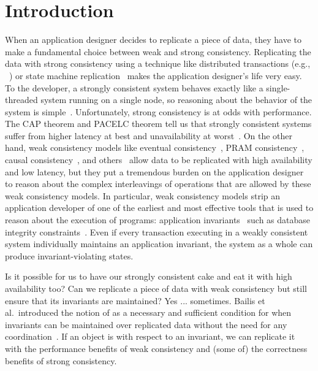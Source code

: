 \section{Introduction}
When an application designer decides to replicate a piece of data, they have to
make a fundamental choice between weak and strong consistency. Replicating the
data with strong consistency using a technique like distributed transactions (e.g., ~\cite{bernstein1981concurrency,mohan1986transaction}) or state machine
replication~\cite{schneider1990implementing, lamport1998part,
liskov2012viewstamped, ongaro2014search, moraru2013there, vincent2015designing,
oki1988viewstamped, lamport2005generalized, lamport2006fast}  makes the
application designer's life very easy. To the developer, a strongly
consistent system behaves exactly like a single-threaded system running on a
single node, so reasoning about the behavior of the system is
simple~\cite{herlihy1990linearizability}.  Unfortunately, strong consistency is
at odds with performance. The CAP theorem and PACELC theorem tell us that
strongly consistent systems suffer from higher latency at best and
unavailability at worst~\cite{gilbert2002brewer, brewer2012cap,
abadi2012consistency}. On the other hand, weak consistency models like eventual
consistency~\cite{vogels2009eventually}, PRAM
consistency~\cite{lipton1988pram}, causal consistency~\cite{ahamad1995causal},
and others~\cite{lloyd2011don, mehdi2017can} allow data to be replicated with
high availability and low latency, but they put a tremendous burden on the
application designer to reason about the complex interleavings of operations
that are allowed by these weak consistency models. In particular, weak consistency
models strip an application developer of one of the earliest and most effective
tools that is used to reason about the execution of programs: application
invariants~\cite{hoare1969axiomatic, balegas2015towards} such as database integrity constraints~\cite{IntegrityConstraintCitations}. Even if every
transaction executing in a weakly consistent system individually maintains an
application invariant, the system as a whole can produce invariant-violating
states.

Is it possible for us to have our strongly consistent cake and eat it with high
availability too? Can we replicate a piece of data with weak consistency but
still ensure that its invariants are maintained? Yes ... sometimes. Bailis et al.\
introduced the notion of \emph{\invariantconfluence{}} as a necessary and sufficient
condition for when invariants can be maintained over replicated data without
the need for any coordination~\cite{bailis2014coordination}. If an object is
\invariantconfluent{} with respect to an invariant, we can replicate it with
the performance benefits of weak consistency and (some of) the correctness
benefits of strong consistency. 

